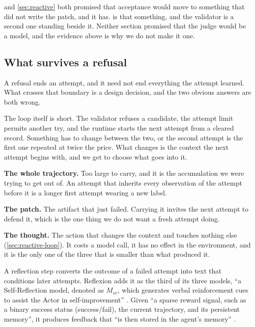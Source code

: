  and \cref{sec:reactive} both promised that acceptance would move to something that
did not write the patch, and it has.  is that something, and the validator is a
second one standing beside it. Neither section promised that the judge would be a model, and the
evidence above is why we do not make it one.

\subsection{What survives a refusal}
\label{sec:reflection}

A refusal ends an attempt, and it need not end everything the attempt learned. What crosses that
boundary is a design decision, and the two obvious answers are both wrong.

The loop itself is short. The validator refuses a candidate, the attempt limit permits another try,
and the runtime starts the next attempt from a cleared record. Something has to change between the
two, or the second attempt is the first one repeated at twice the price. What changes is the
context the next attempt begins with, and we get to choose what goes into it.

\bi

\item \textbf{The whole trajectory.} Too large to carry, and it is the accumulation we were trying
to get out of. An attempt that inherits every observation of the attempt before it is a longer first
attempt wearing a new label.

\item \textbf{The patch.} The artifact that just failed. Carrying it invites the next attempt to
defend it, which is the one thing we do not want a fresh attempt doing.

\item \textbf{The thought.} The action that changes the context and touches nothing else
(\cref{sec:reactive-loop}). It costs a model call, it has no effect in the environment, and it is
the only one of the three that is smaller than what produced it.

\ei

\begin{definition}
\label{def:reflection}
A reflection step converts the outcome of a failed attempt into text that conditions later attempts.
Reflexion adds it as the third of its three models, ``a Self-Reflection model, denoted as $M_{sr}$,
which generates verbal reinforcement cues to assist the Actor in
self-improvement'' \citep[\S3]{shinn2023reflexion}. Given ``a sparse reward signal, such as a binary
success status (success/fail), the current trajectory, and its persistent memory'', it produces
feedback that ``is then stored in the agent's memory'' \citep[\S3]{shinn2023reflexion}.
\end{definition}

